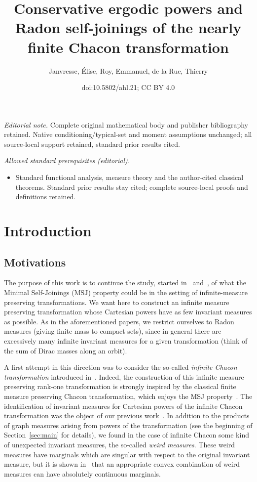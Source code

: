 \documentclass[10pt]{amsart}
\title{Conservative ergodic powers and Radon self-joinings of the nearly finite Chacon transformation}
\author{Janvresse, Élise, Roy, Emmanuel, de la Rue, Thierry}
\date{doi:10.5802/ahl.21; CC BY 4.0}
\theoremstyle{definition}\newtheorem{defi}[theo]{Definition}\newtheorem{rema}[theo]{Remark}\newtheorem{exam}[theo]{Example}\newtheorem{exem}[theo]{Example}\newtheorem{nota}[theo]{Notation}
\begin{document}
\maketitle
\noindent\textit{Editorial note.} Complete original mathematical body and publisher bibliography retained. Native conditioning/typical-set and moment assumptions unchanged; all source-local support retained, standard prior results cited.\par\medskip
\noindent\textit{Allowed standard prerequisites (editorial).}\begin{itemize}
\item Standard functional analysis, measure theory and the author-cited classical theorems. Standard prior results stay cited; complete source-local proofs and definitions retained.
\end{itemize}\medskip

\section{Introduction}

\subsection{Motivations}

The purpose of this work is to continue the study, started in~\cite{ChaconInfinite} and~\cite{RadonMSJ}, of what the Minimal Self-Joinings (MSJ) property could be in the setting of infinite-measure preserving transformations. We want here to construct an infinite measure preserving transformation whose Cartesian powers have as few invariant measures as possible. As in the aforementioned papers, we restrict ourselves to Radon measures (giving finite mass to compact sets), since in general there are excessively many infinite invariant measures for a given transformation (think of the sum of Dirac masses along an orbit).

A first attempt in this direction was to consider the so-called \emph{infinite Chacon transformation} introduced in~\cite{AFS1997}. Indeed, the construction of this infinite measure preserving rank-one transformation is strongly inspired by the classical finite measure preserving Chacon transformation, which enjoys the MSJ property~\cite{DJRS1980}. The identification of invariant measures for Cartesian powers of the infinite Chacon transformation was the object of our previous work~\cite{ChaconInfinite}. In addition to the products of graph measures arising from powers of the transformation (see the beginning of Section~\ref{sec:main} for details), we found in the case of infinite Chacon some kind of unexpected invariant measures, the so-called \emph{weird measures}. These weird measures have marginals which are singular with respect to the original invariant measure, but it is shown in~\cite[Example~5.4]{RadonMSJ} that an appropriate convex combination of weird measures can have absolutely continuous marginals.
\end{document}

